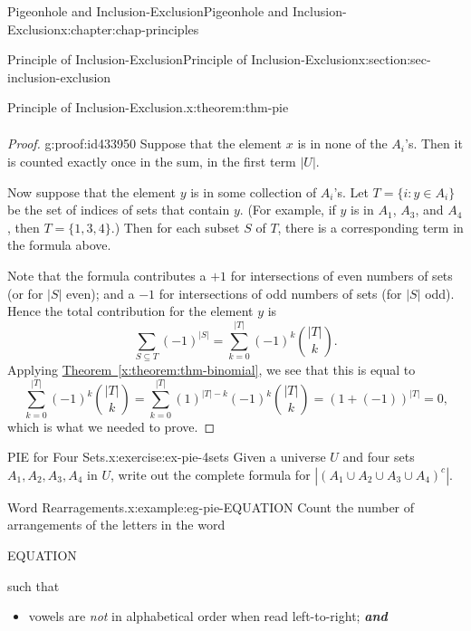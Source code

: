 \documentclass[oneside,10pt,]{book}
\newcommand{\xreffont}{\relax}
\newcommand{\alert}[1]{\textbf{\textit{#1}}}
\numberwithin{equation}{section}
\begin{document}
\begin{chapterptx}{Pigeonhole and Inclusion-Exclusion}{}{Pigeonhole and Inclusion-Exclusion}{}{}{x:chapter:chap-principles}
\begin{sectionptx}{Principle of Inclusion-Exclusion}{}{Principle of Inclusion-Exclusion}{}{}{x:section:sec-inclusion-exclusion}
\begin{theorem}{Principle of Inclusion-Exclusion.}{}{x:theorem:thm-pie}
\begin{align*}
\end{align*}
%
\end{theorem}
\begin{proof}{}{g:proof:id433950}
Suppose that the element \(x\) is in none of the \(A_i\)'s. Then it is counted exactly once in the sum, in the first term \(|U|\).%
\par
Now suppose that the element \(y\) is in some collection of \(A_i\)'s. Let \(T = \{i : y \in A_i\}\) be the set of indices of sets that contain \(y\). (For example, if \(y\) is in \(A_1\), \(A_3\), and \(A_4\), then \(T = \{1,3,4\}\).) Then for each subset \(S\) of \(T\), there is a corresponding term in the formula above.%
\par
Note that the formula contributes a \(+1\) for intersections of even numbers of sets (or for \(|S|\) even); and a \(-1\) for intersections of odd numbers of sets (for \(|S|\) odd). Hence the total contribution for the element \(y\) is%
\begin{equation*}
\sum_{S \subseteq T} (-1)^{|S|} = \sum_{k=0}^{|T|} (-1)^k\binom{|T|}{k}\text{.}
\end{equation*}
Applying \hyperref[x:theorem:thm-binomial]{Theorem~{\xreffont\ref{x:theorem:thm-binomial}}}, we see that this is equal to%
\begin{equation*}
\sum_{k=0}^{|T|} (-1)^k\binom{|T|}{k} = \sum_{k=0}^{|T|} (1)^{|T|-k}(-1)^k\binom{|T|}{k} = \left( 1 + (-1) \right)^{|T|} = 0\text{,}
\end{equation*}
which is what we needed to prove.%
\end{proof}
\begin{inlineexercise}{PIE for Four Sets.}{x:exercise:ex-pie-4sets}%
Given a universe \(U\) and four sets \(A_1, A_2, A_3, A_4\) in \(U\), write out the complete formula for \(|(A_1 \cup A_2 \cup A_3 \cup A_4)^c|\).%
\end{inlineexercise}
\begin{example}{Word Rearragements.}{x:example:eg-pie-EQUATION}%
Count the number of arrangements of the letters in the word%
\begin{sidebyside}{1}{0.425}{0.425}{0}%
\begin{sbspanel}{0.15}%
EQUATION%
\end{sbspanel}%
\end{sidebyside}%
\par
such that%
\begin{itemize}[label=\textbullet]
\item{}vowels are \emph{not} in alphabetical order when read left-to-right; \alert{and}%

\end{itemize}
\end{example}
\end{sectionptx}
\end{chapterptx}
\end{document}
